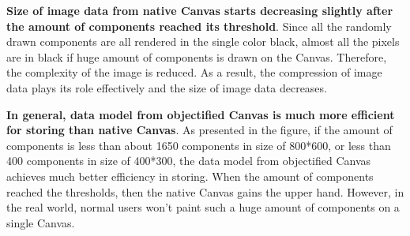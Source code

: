 \textbf{Size of image data from native Canvas starts decreasing slightly after the amount of components reached its threshold}. Since all the randomly drawn components are all rendered in the single color black, almost all the pixels are in black if huge amount of components is drawn on the Canvas. Therefore, the complexity of the image is reduced. As a result, the compression of image data plays its role effectively and the size of image data decreases.

\textbf{In general, data model from objectified Canvas is much more efficient for storing than native Canvas}. As presented in the figure, if the amount of components is less than about 1650 components in size of 800*600, or less than 400 components in size of 400*300, the data model from objectified Canvas achieves much better efficiency in storing. When the amount of components reached the thresholds, then the native Canvas gains the upper hand. However, in the real world, normal users won't paint such a huge amount of components on a single Canvas.